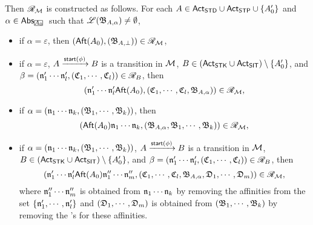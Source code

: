 Then $\mathscr{R}_{\mathcal{M} }$ is constructed as follows. 
For each $A \in {\sf Act}_{\sf STD} \cup {\sf Act}_{\sf STP} \cup \{A'_0\}$ and $\alpha \in \abs_{\mhcancel{A_0}}$ such that ${\mathscr{L} }({\mathfrak{B} }_{A, \alpha}) \neq \emptyset$,
\begin{itemize}
    \item if $\alpha = \varepsilon$, then $({\sf Aft}(A_0), ({\mathfrak{B} }_{A, \bot})) \in \mathscr{R}_{\mathcal{M} }$,
    \item if $\alpha = \varepsilon$, $A \xrightarrow{{\mathsf{start} }(\phi)} B$ is a transition in ${\mathcal{M} }$, $B \in ({\sf Act}_{\sf STK} \cup {\sf Act}_{\sf SIT}) \setminus \{A'_0\}$,  and $\beta = (\mathfrak{n}'_1 \cdots  \mathfrak{n}'_l, ({\mathfrak{C} }_1, \cdots, {\mathfrak{C} }_l)) \in \mathscr{R}_B$, then 
    $$(\mathfrak{n}'_1 \cdots  \mathfrak{n}'_l {\sf Aft}(A_0), ({\mathfrak{C} }_1, \cdots, {\mathfrak{C} }_l, {\mathfrak{B} }_{A, \alpha})) \in \mathscr{R}_{\mathcal{M} },$$  
    \item if $\alpha = (\mathfrak{n}_1 \cdots \mathfrak{n}_k, ({\mathfrak{B} }_1, \cdots, {\mathfrak{B} }_k))$, then 
    $$({\sf Aft}(A_0)\mathfrak{n}_1 \cdots \mathfrak{n}_k, ({\mathfrak{B} }_{A, \alpha}, {\mathfrak{B} }_1, \cdots, {\mathfrak{B} }_k)) \in \mathscr{R}_{\mathcal{M} },$$
    \item if $\alpha = (\mathfrak{n}_1 \cdots \mathfrak{n}_k, ({\mathfrak{B} }_1,\cdots,{\mathfrak{B} }_k))$, $A \xrightarrow{{\mathsf{start} }(\phi)} B$ is a transition in ${\mathcal{M} }$, $B \in ({\sf Act}_{\sf STK} \cup {\sf Act}_{\sf SIT}) \setminus \{A'_0\}$,  and $\beta = (\mathfrak{n}'_1 \cdots  \mathfrak{n}'_l, ({\mathfrak{C} }_1, \cdots, {\mathfrak{C} }_l)) \in \mathscr{R}_B$, then 
    $$(\mathfrak{n}'_1 \cdots  \mathfrak{n}'_l {\sf Aft}(A_0) \mathfrak{n}''_1 \cdots \mathfrak{n}''_m, ({\mathfrak{C} }_1, \cdots, {\mathfrak{C} }_l, {\mathfrak{B} }_{A, \alpha}, {\mathfrak{D} }_1, \cdots, {\mathfrak{D} }_m)) \in \mathscr{R}_{\mathcal{M} },$$ 
    where $\mathfrak{n}''_1 \cdots \mathfrak{n}''_m$ is obtained from $\mathfrak{n}_1 \cdots \mathfrak{n}_k$ by removing the affinities from the set $\{\mathfrak{n}'_1, \cdots, \mathfrak{n}'_l\}$ and $({\mathfrak{D} }_1, \cdots, {\mathfrak{D} }_m)$ is obtained from $({\mathfrak{B} }_1, \cdots, {\mathfrak{B} }_k)$ by removing the {\WOTrNFA}'s for these affinities.  
\end{itemize}


